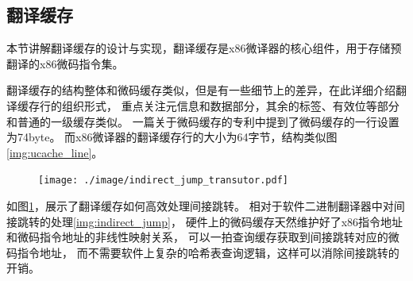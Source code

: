 \subsection{翻译缓存}\label{sec:tcache}

本节讲解翻译缓存的设计与实现，翻译缓存是x86微译器的核心组件，用于存储预翻译的x86微码指令集。

翻译缓存的结构整体和微码缓存类似，但是有一些细节上的差异，在此详细介绍翻译缓存行的组织形式，
重点关注元信息和数据部分，其余的标签、有效位等部分和普通的一级缓存类似。
一篇关于微码缓存的专利\cite{uopPatent}中提到了微码缓存的一行设置为74byte。
而x86微译器的翻译缓存行的大小为64字节，结构类似图\ref{img:ucache_line}。


\begin{figure}[!htbp]
  \centering
  \texttt{[image: ./image/indirect\_jump\_transutor.pdf]}
  \label{img:indirect_jump_transutor}
\end{figure}

如图\ref{img:indirect_jump_transutor}，展示了翻译缓存如何高效处理间接跳转。
相对于软件二进制翻译器中对间接跳转的处理\ref{img:indirect_jump}，
硬件上的微码缓存天然维护好了x86指令地址和微码指令地址的非线性映射关系，
可以一拍查询缓存获取到间接跳转对应的微码指令地址，
而不需要软件上复杂的哈希表查询逻辑，这样可以消除间接跳转的开销。






